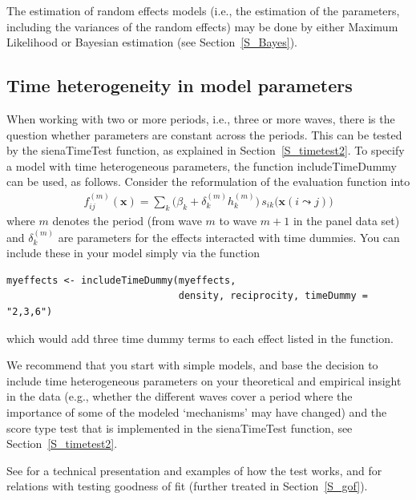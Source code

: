 \documentclass[a4paper,fleqn,11pt]{article}
\newcommand{\+}{\, + \,}
\newcommand{\sfn}[1]{\textsf{#1}}
\begin{document}
The estimation of random effects models
(i.e., the estimation of the parameters,
including the variances of the random effects)
may be done by either Maximum Likelihood
or Bayesian estimation (see Section~\ref{S_Bayes}).

\fi

\subsection{Time heterogeneity in model parameters}
\label{S_timetest1}

When working with two or more periods, i.e., three or more waves,
there is the question whether parameters are constant across the periods.
This can be tested by the \textsf{sienaTimeTest} function, as explained
in Section~\ref{S_timetest2}.
To specify a model with time heterogeneous parameters, the function
\sfn{includeTimeDummy} can be used, as follows.
Consider the reformulation of the evaluation function into
\begin{align}
f^{(m)}_{ij}(\mathbf{x})= \sum_k \Big(\beta_k + \delta_k^{(m)} h_k^{(m)}\Big)
                              \,      s_{ik}\big(\mathbf{x}(i \leadsto j)\big)
\label{eq:fmij}
\end{align}
where $m$ denotes the period (from wave $m$ to wave $m+1$
in the panel data set)
and $\delta_k^{(m)}$ are parameters for the effects interacted
with time dummies. You
can include these in your model simply via the function
\begin{verbatim}
myeffects <- includeTimeDummy(myeffects,
                              density, reciprocity, timeDummy = "2,3,6")
\end{verbatim}
which would add three time dummy terms to each effect listed in the function.

We recommend that you start with simple models,
and base the decision to include time heterogeneous parameters
on your theoretical and empirical insight in the data
(e.g., whether the different waves cover a period where the importance
of some of the modeled `mechanisms' may have changed) and
the score type test that is implemented in the \textsf{sienaTimeTest} function,
see Section~\ref{S_timetest2}.

See \citet{Lospinoso2011} for a technical presentation
and examples of how the test works,
and \citet{LospinosoSnijders2019} for relations with
testing goodness of fit (further treated in Section~\ref{S_gof}).
\end{document}
